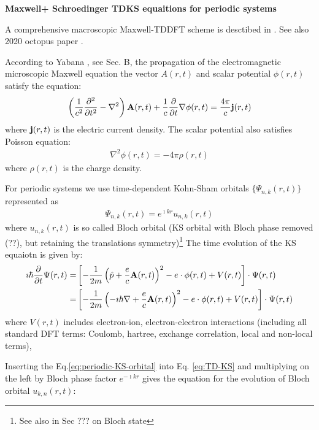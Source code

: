 \documentclass[11pt]{article}
\begin{document}
{\bf Maxwell+ Schroedinger  TDKS equaitions for periodic systems}


A comprehensive macroscopic Maxwell-TDDFT scheme is desctibed in  \cite{prb-2018-Yabana}. 
See also 2020 octopus paper \cite{octopus-rt-tddft-JCP-2020}.


According to  Yabana \cite{prb-2018-Yabana}, see Sec. B, the propagation of the electromagnetic  microscopic Maxwell  equation  the vector $A(r,t)$ and scalar  potential $\phi(r,t)$ satisfy the equation:
\begin{align*}
    \left( \frac{1}{c^2} \pdv{^2}{t^2} -\nabla^2 \right) \vb{A}(r,t)  + \frac{1}{c} \pdv{}{t} \nabla \phi(r,t) = \frac{4\pi}{c} \vb j(r,t)
\end{align*}
where $\vb j(r,t)$ is the electric current density. The scalar potential also satisfies Poisson equation:
\begin{align*}
    \nabla^2 \phi(r,t) = - 4\pi \rho(r,t)
\end{align*}
 where $\rho(r,t)$ is  the charge density.

 For periodic systems   we use time-dependent Kohn-Sham orbitals $\{ \Psi_{n,k}(r,t)\}$  represented as
\begin{align}
    \Psi_{n,k} (r,t) = e^{\imath  kr} u_{n,k}(r,t) 
    \label{eq:periodic-KS-orbital}
\end{align}
where  $u_{n,k}(r,t)$ is so called Bloch orbital (KS orbital with  Bloch phase removed (??), but retaining the translations symmetry)\footnote{ See also \cite{Springborg-book-2000}  in Sec ???  on Bloch state}
The time evolution of the KS equaiotn is given by:
\begin{align}
    \imath \hbar \pdv{}{t} \Psi(r,t)  = & 
    \left[ -\frac{1}{2m} \left( \hat p +\frac{e}{c} \vb A(r,t)\right)^2   -e \cdot \phi (r,t) + V(r,t) \right] \cdot \Psi(r,t)  \\
    =&  \left[ -\frac{1}{2m} \left(  -\imath \hbar \nabla +\frac{e}{c} \vb A(r,t)\right)^2   -e \cdot \phi (r,t) + V(r,t) \right] \cdot \Psi(r,t)
    \label{eq:TD-KS0}
\end{align}
where $V(r,t)$ includes electron-ion,  electron-electron  interactions (including all standard DFT terms: Coulomb, hartree, exchange correlation, local and non-local terms),

Inserting  the  Eq.\ref{eq:periodic-KS-orbital}  into Eq. \ref{eq:TD-KS} and multiplying on the left  by Bloch phase factor $e^{-\imath k r }$   gives  the equation for the evolution of Bloch orbital $u_{k,n}(r,t)$:
\end{document}

